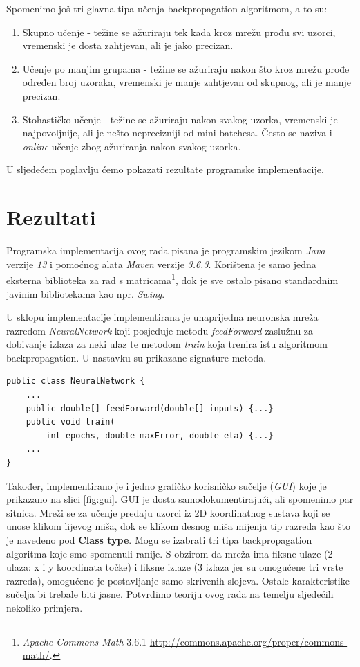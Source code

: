 \documentclass[times, utf8, zavrsni]{fer}
\begin{document}
\bigskip

Spomenimo još tri glavna tipa učenja backpropagation algoritmom, a to su:
\begin{enumerate}
    \item Skupno učenje  - težine se ažuriraju tek kada kroz mrežu prođu svi uzorci, vremenski je dosta zahtjevan, ali je jako precizan.
    \item Učenje po manjim grupama  - težine se ažuriraju nakon što kroz mrežu prođe određen broj uzoraka, vremenski je manje zahtjevan od skupnog, ali je manje precizan.
    \item Stohastičko učenje  - težine se ažuriraju nakon svakog uzorka, vremenski je najpovoljnije, ali je nešto neprecizniji od mini-batchesa. Često se naziva i \textit{online} učenje zbog ažuriranja nakon svakog uzorka.
\end{enumerate}

\bigskip
\bigskip

U sljedećem poglavlju ćemo pokazati rezultate programske implementacije.

\chapter{Rezultati}
Programska implementacija ovog rada pisana je programskim jezikom \textit{Java} verzije \textit{13} i pomoćnog alata \textit{Maven} verzije \textit{3.6.3}. Korištena je samo jedna eksterna biblioteka za rad s matricama\footnote{\textit{Apache Commons Math} 3.6.1 \url{http://commons.apache.org/proper/commons-math/}.}, dok je sve ostalo pisano standardnim javinim bibliotekama kao npr. \textit{Swing}.

U sklopu implementacije implementirana je unaprijedna neuronska mreža razredom \textit{NeuralNetwork} koji posjeduje metodu \textit{feedForward} zaslužnu za dobivanje izlaza za neki ulaz te metodom \textit{train} koja trenira istu algoritmom backpropagation. U nastavku su prikazane signature metoda.
\begin{lstlisting}
public class NeuralNetwork {
    ...
    public double[] feedForward(double[] inputs) {...}
    public void train(
        int epochs, double maxError, double eta) {...}
    ...
}
\end{lstlisting}
Također, implementirano je i jedno grafičko korisničko sučelje (\textit{GUI}) koje je prikazano na slici \ref{fig:gui}. GUI je dosta samodokumentirajući, ali spomenimo par sitnica. Mreži se za učenje predaju uzorci iz 2D koordinatnog sustava koji se unose klikom lijevog miša, dok se klikom desnog miša mijenja tip razreda kao što je navedeno pod \textbf{Class type}. Mogu se izabrati tri tipa backpropagation algoritma koje smo spomenuli ranije. S obzirom da mreža ima fiksne ulaze (2 ulaza: x i y koordinata točke) i fiksne izlaze (3 izlaza jer su omogućene tri vrste razreda), omogućeno je postavljanje samo skrivenih slojeva. Ostale karakteristike sučelja bi trebale biti jasne. Potvrdimo teoriju ovog rada na temelju sljedećih nekoliko primjera.
\end{document}
